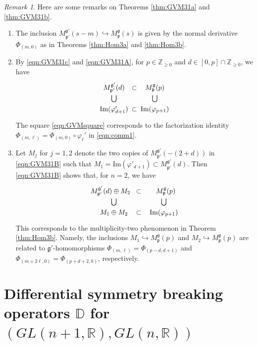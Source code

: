 \documentclass[reqno,11pt]{amsart}
\theoremstyle{remark}
\newtheorem{rem}[equation]{Remark}
\theoremstyle{definition}
\numberwithin{equation}{section}
\newcommand{\fg}{{\mathfrak g}}
\newcommand{\fp}{{\mathfrak p}}
\newcommand{\R}{\mathbb{R}}
\newcommand{\Z}{\mathbb{Z}}
\renewcommand{\Im}{\mathrm{Im}}
\newcommand{\Mp}{M^{\fg}_{\fp}}
\newcommand{\Mpp}{M^{\fg'}_{\fp'}}
\newcommand{\bD}{\mathbb{D}}
\begin{document}
\begin{rem}\label{rem:branching916}
Here are some remarks on Theorems \ref{thm:GVM31a} and \ref{thm:GVM31b}. 
\begin{enumerate}
\item
The inclusion $\Mpp(s-m) \hookrightarrow \Mp(s)$ is given by 
the normal derivative $\Phi_{(m,0)}$ as in Theorems \ref{thm:Hom3a}
and  \ref{thm:Hom3b}. 

\item By \eqref{eqn:GVM31c} and \eqref{eqn:GVM31A}, 
for $p \in \Z_{\geq 0}$ and $d \in [0,p]\cap \Z_{\geq 0}$,
we have 
\begin{equation}\label{eqn:GVMsquare}
\begin{aligned}
\xymatrix@C=1pc @R=1pc{
\Mpp(d) 
\ar@{}[r]|*{\subset}
\ar@{}[d]|{\bigcup}& \Mp(p)\ar@{}[d]|{\bigcup}\\
\Im(\varphi'_{d+1})\ar@{}[r]|*{\subset} & \Im(\varphi_{p+1})
}
\end{aligned}
\end{equation}
The square \eqref{eqn:GVMsquare} corresponds to 
the factorization identity $\Phi_{(m,\ell)}=\Phi_{(m,0)} \circ \varphi_\ell'$
in  \eqref{eqn:comm1}.

\item 
Let $M_j$ for $j=1,2$ denote the two copies of $\Mpp(-(2+d))$
in \eqref{eqn:GVM31B} such that $M_1=\Im(\varphi'_{d+1})\subset \Mpp(d)$. 
Then \eqref{eqn:GVM31B} shows that, for $n=2$,  we have 
\begin{equation}\label{eqn:GVMsquare2}
\begin{aligned}
\xymatrix@C=1pc @R=1pc{
\Mpp(d)\oplus M_2\hspace{10pt}
\ar@{}[r]|*{\subset}
\ar@{}[d]|{\bigcup}& 
\;\;
\Mp(p) 
\ar@{}[d]|{\bigcup}\\
M_1\oplus M_2
\ar@{}[r]|*{\subset} &
\Im(\varphi_{p+1})}
\end{aligned}
\end{equation}
This corresponds to the multiplicity-two phenomenon in
Theorem \ref{thm:Hom3b}. Namely,
the inclusions 
$M_1 \hookrightarrow \Mp(p)$
and $M_2 \hookrightarrow \Mp(p)$ 
are related to $\fg'$-homomorphisms $\Phi_{(m,\ell)}=\Phi_{(p-d,d+1)}$ and 
$\Phi_{(m+2\ell,0)}=\Phi_{(p+d+2,0)}$, respectively.
\end{enumerate}
\end{rem}


\section{Differential symmetry breaking operators $\bD$ for $(GL(n+1,\R), GL(n,\R))$}
\label{sec:GL}
\end{document}
